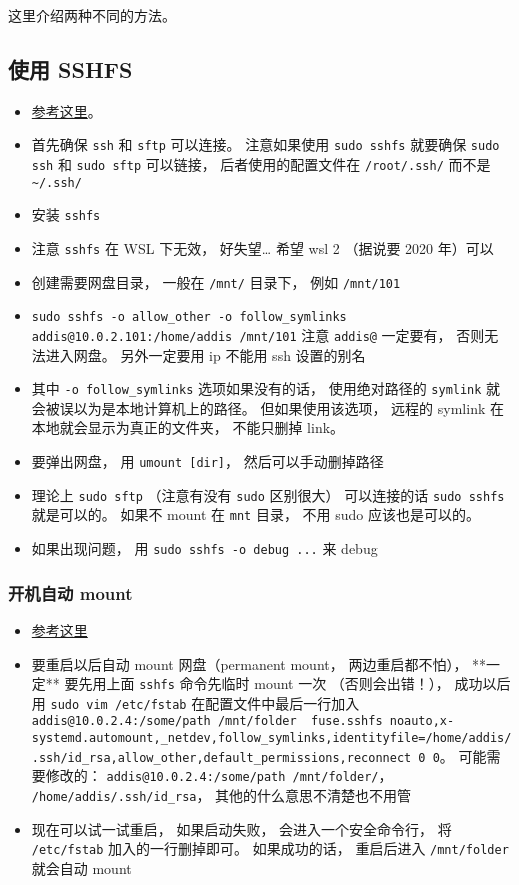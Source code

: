 
这里介绍两种不同的方法。

\subsection{使用 SSHFS}
\begin{itemize}
\item \href{https://www.digitalocean.com/community/tutorials/how-to-use-sshfs-to-mount-remote-file-systems-over-ssh}{参考这里}。
\item 首先确保 \verb`ssh` 和 \verb|sftp| 可以连接。 注意如果使用 \verb|sudo sshfs| 就要确保 \verb|sudo ssh| 和 \verb|sudo sftp| 可以链接， 后者使用的配置文件在 \verb|/root/.ssh/| 而不是 \verb|~/.ssh/|
\item 安装 \verb`sshfs`
\item 注意 \verb`sshfs` 在 WSL 下无效， 好失望… 希望 wsl 2 （据说要 2020 年）可以
\item 创建需要网盘目录， 一般在 \verb`/mnt/` 目录下， 例如 \verb`/mnt/101`
\item \verb`sudo sshfs -o allow_other -o follow_symlinks addis@10.0.2.101:/home/addis /mnt/101` 注意 \verb`addis@` 一定要有， 否则无法进入网盘。 另外一定要用 ip 不能用 ssh 设置的别名
\item 其中 \verb|-o follow_symlinks| 选项如果没有的话， 使用绝对路径的 \verb|symlink| 就会被误以为是本地计算机上的路径。 但如果使用该选项， 远程的 symlink 在本地就会显示为真正的文件夹， 不能只删掉 link。
\item 要弹出网盘， 用 \verb`umount [dir]`， 然后可以手动删掉路径
\item 理论上 \verb|sudo sftp| （注意有没有 \verb|sudo| 区别很大） 可以连接的话 \verb|sudo sshfs| 就是可以的。 如果不 mount 在 \verb|mnt| 目录， 不用 sudo 应该也是可以的。
\item 如果出现问题， 用 \verb|sudo sshfs -o debug ...| 来 debug
\end{itemize}

\subsubsection{开机自动 mount}
\begin{itemize}
\item \href{https://www.linode.com/docs/networking/ssh/using-sshfs-on-linux/}{参考这里}
\item 要重启以后自动 mount 网盘（permanent mount， 两边重启都不怕）， **一定** 要先用上面 \verb`sshfs` 命令先临时 mount 一次 （否则会出错！）， 成功以后用 \verb`sudo vim /etc/fstab` 在配置文件中最后一行加入 \verb`addis@10.0.2.4:/some/path /mnt/folder  fuse.sshfs noauto,x-systemd.automount,_netdev,follow_symlinks,identityfile=/home/addis/.ssh/id_rsa,allow_other,default_permissions,reconnect 0 0`。 可能需要修改的： \verb`addis@10.0.2.4:/some/path /mnt/folder/`， \verb`/home/addis/.ssh/id_rsa`， 其他的什么意思不清楚也不用管
\item 现在可以试一试重启， 如果启动失败， 会进入一个安全命令行， 将 \verb`/etc/fstab` 加入的一行删掉即可。 如果成功的话， 重启后进入 \verb`/mnt/folder` 就会自动 mount
\end{itemize}

